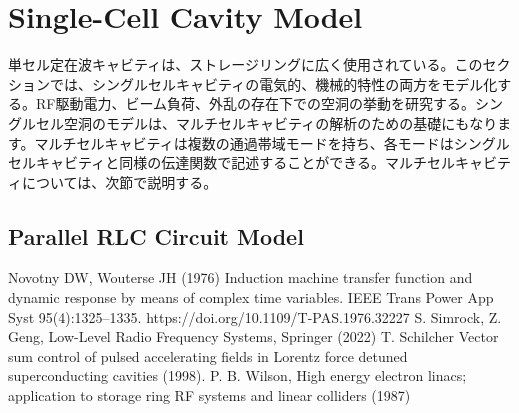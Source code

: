 \documentclass[book]{jlreq}
\begin{document}
\section{Single-Cell Cavity Model}

単セル定在波キャビティは、ストレージリングに広く使用されている。このセクションでは、シングルセルキャビティの電気的、機械的特性の両方をモデル化する。RF駆動電力、ビーム負荷、外乱の存在下での空洞の挙動を研究する。シングルセル空洞のモデルは、マルチセルキャビティの解析のための基礎にもなります。マルチセルキャビティは複数の通過帯域モードを持ち、各モードはシングルセルキャビティと同様の伝達関数で記述することができる。マルチセルキャビティについては、次節で説明する。

\subsection{Parallel RLC Circuit Model}


\begin{thebibliography}{9}
    Novotny DW, Wouterse JH (1976) Induction machine transfer function and dynamic response by means of complex time variables. IEEE Trans Power App Syst 95(4):1325–1335. https://doi.org/10.1109/T-PAS.1976.32227
    S. Simrock, Z. Geng, Low-Level Radio Frequency Systems, Springer (2022)
    T. Schilcher Vector sum control of pulsed accelerating fields in Lorentz force detuned superconducting cavities (1998).
    P. B. Wilson, High energy electron linacs; application to storage ring RF systems and linear colliders (1987)
\end{thebibliography}
%
%
\end{document}
